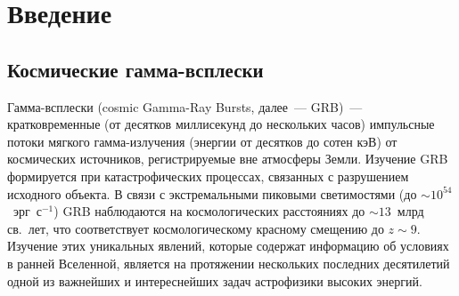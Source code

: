 \chapter*{Введение}					

\section*{Космические гамма-всплески}
Гамма-всплески (cosmic Gamma-Ray Bursts, далее~--- GRB)~--- кратковременные 
(от десятков миллисекунд до нескольких часов) импульсные потоки мягкого гамма-излучения 
(энергии от десятков до сотен кэВ) от космических источников, регистрируемые вне атмосферы Земли.
Изучение GRB формируется при катастрофических процессах, связанных с разрушением исходного
объекта. В связи с экстремальными пиковыми светимостями (до $\sim 10^{54}$~эрг~с$^{-1}$)
GRB наблюдаются на космологических расстояниях до $\sim 13$~млрд св.~лет, что соответствует 
космологическому красному смещению до $z\sim9$. Изучение этих уникальных явлений, которые содержат
информацию об условиях в ранней Вселенной, является на протяжении нескольких 
последних десятилетий одной из важнейших и интереснейших задач астрофизики высоких энергий.       

